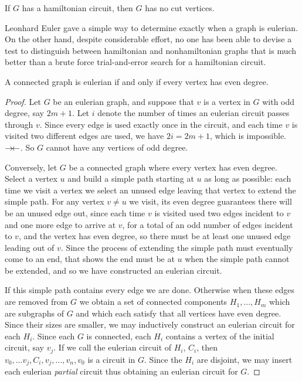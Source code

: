  If $G$ has a hamiltonian circuit, then $G$ has no cut vertices. 

Leonhard Euler gave a simple way to determine exactly when a graph is eulerian. On the other hand,  despite considerable effort, no one has been able to devise a test to distinguish between hamiltonian and nonhamiltonian graphs that is much better than a brute force trial{-}and{-}error search for a hamiltonian circuit. 

\begin{thm}
 A connected graph is eulerian if and only if  every vertex has even degree.
\end{thm}
\begin{proof}
 Let $G$ be an eulerian graph, and suppose that $v$ is a vertex in 
 $G$ with odd degree, say $2m+1$. Let $i$ denote the number of times an eulerian circuit  passes through 
 $v$. Since every edge is used exactly once in the circuit, and each time $v$ is visited two different edges are used, 
 we have $2i=2m+1$, which is impossible. $\rightarrow \!\leftarrow$. So $G$ cannot have any vertices of odd degree.
 
 Conversely, let $G$ be a connected graph where every vertex has even degree. 
 Select a vertex $u$ and build  a simple path starting at $u$ as long as possible:
 each time we visit a vertex we select an unused edge leaving that vertex to extend the simple path. For any vertex $v\neq u$ we visit,  its even
 degree guarantees there will be an unused edge out, since each time $v$ is visited used two edges incident to $v$ and one more edge to arrive at $v$, for a total of an odd number of edges incident to $v$, and the vertex has even degree, so there must be at least one unused edge leading out of $v$.
 Since the process of extending the simple path must eventually come to an end, that shows the end must be at $u$ when the simple path cannot be extended, and so we have constructed an eulerian circuit. 
  
 If this simple path contains every edge we are done. Otherwise when these edges are removed from $G$
 we obtain a set of connected components $H_1,...,H_m$ which are subgraphs of $G$ and which
 each satisfy that all vertices have even degree. Since their sizes are smaller, we may inductively
 construct an eulerian circuit for each $H_i$. Since each $G$ is connected, each $H_i$ contains
 a vertex of the initial circuit, say $v_j$. If we call the eulerian circuit of $H_i$, $C_i$, then 
 $v_0,...v_j,C_i,v_j,...,v_n,v_0$ is a circuit in $G$. Since the $H_i$ are disjoint, we may insert each 
 eulerian {\it partial} circuit thus obtaining an eulerian circuit for $G$.
\end{proof} 

